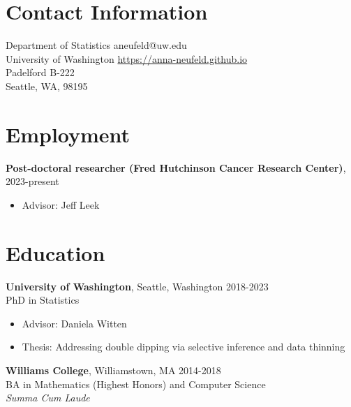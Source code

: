\documentclass[margin, 10pt]{res} %
\begin{document}
\begin{resume}

 

\section{Contact Information}
Department of Statistics \hfill  aneufeld@uw.edu\\
University of Washington \hfill \href{https://anna-neufeld.github.io}{https://anna-neufeld.github.io} \\
Padelford B-222  \hfill \\
Seattle, WA, 98195



\section{Employment} 
{\textbf{Post-doctoral researcher (Fred Hutchinson Cancer Research Center)},} \hfill 2023-present
\begin{itemize}
\item Advisor: Jeff Leek
\end{itemize}

\section{Education} 

{\textbf{University of Washington},} Seattle, Washington \hfill 2018-2023 \\
PhD in Statistics
\begin{itemize}
\item Advisor: Daniela Witten
\item Thesis: Addressing double dipping via selective inference and data thinning 
\end{itemize}

{\textbf{Williams College}}, Williamstown, MA \hfill 2014-2018  \\
BA in Mathematics (Highest Honors) and Computer Science \\ 
\textit{Summa Cum Laude}%
 

\end{resume}
\end{document}
